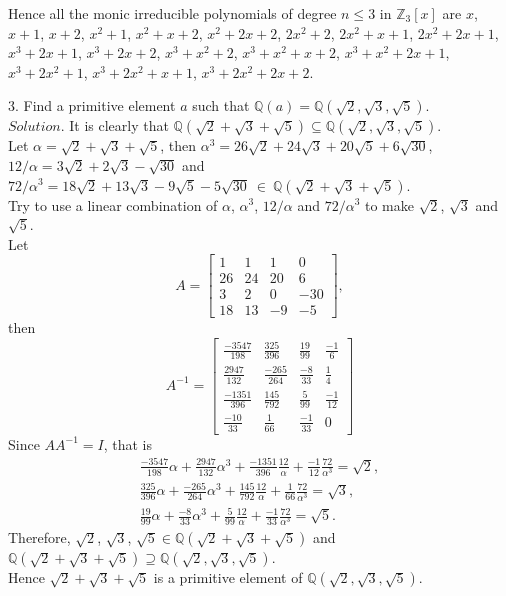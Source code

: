 \documentclass[12pt]{book}
\begin{document}
\begin{CJK}{UTF8}{bsmi}
Hence all the monic irreducible polynomials of degree $n\le3$ in $\mathbb{Z}_3[x]$ are $x$, $x+1$, $x+2$, $x^2+1$, $x^2+x+2$, $x^2+2x+2$, $2x^2+2$, $2x^2+x+1$, $2x^2+2x+1$, $x^3+2x+1$, $x^3+2x+2$, $x^3+x^2+2$, $x^3+x^2+x+2$, $x^3+x^2+2x+1$, $x^3+2x^2+1$, $x^3+2x^2+x+1$, $x^3+2x^2+2x+2$. \\

\clearpage

3. Find a primitive element $a$ such that $\mathbb{Q}(a)=\mathbb{Q}(\sqrt{2}, \sqrt{3}, \sqrt{5})$. \\
$Solution$. It is clearly that $\mathbb{Q}(\sqrt{2}+\sqrt{3}+\sqrt{5})\subseteq\mathbb{Q}(\sqrt{2}, \sqrt{3}, \sqrt{5})$. \\
Let $\alpha=\sqrt{2}+\sqrt{3}+\sqrt{5}$, then $\alpha^3=26\sqrt{2}+24\sqrt{3}+20\sqrt{5}+6\sqrt{30}$, $12/\alpha=3\sqrt{2}+2\sqrt{3}-\sqrt{30}$ and $72/\alpha^3=18\sqrt{2}+13\sqrt{3}-9\sqrt{5}-5\sqrt{30}\ \in\ \mathbb{Q}(\sqrt{2}+\sqrt{3}+\sqrt{5})$. \\
Try to use a linear combination of $\alpha$, $\alpha^3$, $12/\alpha$ and $72/\alpha^3$ to make $\sqrt{2}$, $\sqrt{3}$ and $\sqrt{5}$. \\
Let 
\[
A = 
\begin{bmatrix}
    1 & 1 & 1 & 0 \\
    26 & 24 & 20 & 6 \\
    3 & 2 & 0 & -30 \\
    18 & 13 & -9 & -5
\end{bmatrix},
\]
then
\[
A^{-1} = 
\begin{bmatrix}
\frac{-3547}{198} & \frac{325}{396} & \frac{19}{99} & \frac{-1}{6} \\
\frac{2947}{132} & \frac{-265}{264} & \frac{-8}{33} & \frac{1}{4} \\
\frac{-1351}{396} & \frac{145}{792} & \frac{5}{99} & \frac{-1}{12} \\
\frac{-10}{33} & \frac{1}{66} & \frac{-1}{33} & 0
\end{bmatrix}
\]
Since $AA^{-1}=I$, that is
\begin{eqnarray*}
\frac{-3547}{198}\alpha + 
\frac{2947}{132}\alpha^3 + 
\frac{-1351}{396}\frac{12}{\alpha} + \frac{-1}{12}\frac{72}{\alpha^3} = 
\sqrt{2}, \\
\frac{325}{396}\alpha + 
\frac{-265}{264}\alpha^3 + 
\frac{145}{792}\frac{12}{\alpha} +
\frac{1}{66}\frac{72}{\alpha^3} = 
\sqrt{3}, \\
\frac{19}{99}\alpha + 
\frac{-8}{33}\alpha^3 + 
\frac{5}{99}\frac{12}{\alpha} +
\frac{-1}{33}\frac{72}{\alpha^3} = 
\sqrt{5}. 
\end{eqnarray*}
Therefore, $\sqrt{2}$, $\sqrt{3}$, $\sqrt{5}\in\mathbb{Q}(\sqrt{2}+\sqrt{3}+\sqrt{5})$ and $\mathbb{Q}(\sqrt{2}+\sqrt{3}+\sqrt{5})\supseteq\mathbb{Q}(\sqrt{2}, \sqrt{3}, \sqrt{5})$. \\
Hence $\sqrt{2}+\sqrt{3}+\sqrt{5}$ is a primitive element of $\mathbb{Q}(\sqrt{2}, \sqrt{3}, \sqrt{5})$. \\


\end{CJK}
\end{document}
